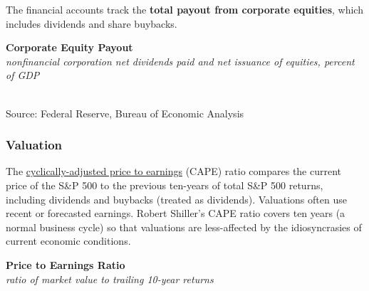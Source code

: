 \documentclass{report}
\makeatletter
\newcommand{\tbllink}[1]{\href{https://raw.githubusercontent.com/bdecon/US-chartbook/master/chartbook/data/#1}{\faTable}}
\newcommand*\short[1]{\expandafter\@gobbletwo\number\numexpr#1\relax}
\newcommand{\sbar}[4]{
		\addplot[ybar stacked, bar width=2.3pt, draw opacity=0, fill=#1] 
			table [x=#2, y=#3, col sep=comma]{#4};}
\newcommand{\dateaxisticks}{
		date coordinates in=x, axis line style={draw=none},
		xmax={2023-11-30},
		max space between ticks=40,	    
		xtick={{1990-01-01}, {1992-01-01}, {1994-01-01}, 
			{1996-01-01}, {1998-01-01}, {2000-01-01}, 
			{2002-01-01}, {2004-01-01}, {2006-01-01},
			{2008-01-01}, {2010-01-01}, {2012-01-01}, {2014-01-01},
		    {2016-01-01}, {2018-01-01}, {2020-01-01}, {2022-01-01}, 
		    {2024-01-01}, {2026-01-01}},
		minor xtick={{1989-01-01}, {1991-01-01}, {1993-01-01},
			{1995-01-01}, {1997-01-01}, {1999-01-01}, 
			{2001-01-01}, {2003-01-01}, {2005-01-01}, {2007-01-01},
		    {2009-01-01}, {2011-01-01}, {2013-01-01}, {2015-01-01},
		    {2017-01-01}, {2019-01-01}, {2021-01-01}, {2023-01-01}, 
		    {2025-01-01}, {2027-01-01}},
		enlarge y limits={0.06}, enlarge x limits={0.01},
		xticklabel style={align=center, yshift=-2pt}, tick label style={inner sep=0pt},
		}
\newcommand{\bbar}[2]{extra #1 ticks = {{#2}}, extra #1 tick labels = ,
		extra #1 tick style = {grid=major, grid style={thick, black!25}},}
\newcommand{\rbars}{
		\fill[color=black!10] (axis cs:{1990-07-01},\pgfkeysvalueof{/pgfplots/ymin}) rectangle 
			(axis cs:{1991-03-01}, \pgfkeysvalueof{/pgfplots/ymax});
		\fill[color=black!10] (axis cs:{2007-12-01},\pgfkeysvalueof{/pgfplots/ymin}) rectangle 
			(axis cs:{2009-07-01}, \pgfkeysvalueof{/pgfplots/ymax});
		\fill[color=black!10] (axis cs:{2001-03-01},\pgfkeysvalueof{/pgfplots/ymin}) rectangle 
			(axis cs:{2001-11-01}, \pgfkeysvalueof{/pgfplots/ymax});
		\fill[color=black!10] (axis cs:{2020-02-01},\pgfkeysvalueof{/pgfplots/ymin}) rectangle 
			(axis cs:{2020-05-01}, \pgfkeysvalueof{/pgfplots/ymax});}
\makeatother
\begin{document}
{\begin{minipage}{0.76\textwidth}
The financial accounts track the \textbf{total payout from corporate equities}, which includes dividends and share buybacks. 
\vspace{1mm}

\normalsize \textbf{Corporate Equity Payout}\\
\footnotesize{\textit{nonfinancial corporation net dividends paid and net issuance of equities, percent of GDP}}\\
\hspace*{-1mm} \\
\footnotesize{Source: Federal Reserve, Bureau of Economic Analysis} \hfill \tbllink{eq_payout.csv}
\end{minipage}
\newpage
\begin{minipage}{0.76\textwidth}
 
\subsubsection*{Valuation}
\small The \href{http://www.econ.yale.edu/~shiller/data.htm}{cyclically-adjusted price to earnings} (CAPE) ratio compares the current price of the S\&P 500 to the previous ten-years of total S\&P 500 returns, including dividends and buybacks (treated as dividends). Valuations often use recent or forecasted earnings. Robert Shiller's CAPE ratio covers ten years (a normal business cycle) so that valuations are less-affected by the idiosyncrasies of current economic conditions. 


\end{minipage}
\vspace*{-1mm}

\begin{minipage}{0.37\textwidth}
\normalsize \textbf{Price to Earnings Ratio}\\
\footnotesize{\textit{ratio of market value to trailing 10-year returns}}
\vspace{2.9cm}


\end{minipage}}
\end{document}

